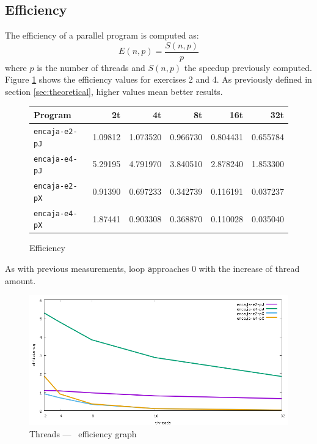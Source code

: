 \documentclass[a4paper]{article}
\newcommand{\m}[1]{\texttt{#1}}
\newcommand{\x}[1]{\m{#1}}
\begin{document}
\subsection{Efficiency}
The efficiency of a parallel program is computed as:
\begin{equation}
E(n,p)=\frac{S(n,p)}{p}
\end{equation}
where $p$ is the number of threads and $S(n,p)$ the speedup previously computed. Figure \ref{fig:table-efficiency} shows the efficiency values for exercises 2 and 4. As previously defined in section \ref{sec:theoretical}, higher values mean better results.

\begin{figure}[h]
	\centering
	\begin{tabular}{l r r r r r}
		Program 			  & 2t  	& 4t 	   & 8t 	  & 16t      & 32t 		\\ \hline
		\m{encaja-e2-pJ}	  & 1.09812 & 1.073520 & 0.966730 & 0.804431 & 0.655784	\\
		\m{encaja-e4-pJ}	  & 5.29195 & 4.791970 & 3.840510 & 2.878240 & 1.853300	\\
		\m{encaja-e2-pX}	  & 0.91390 & 0.697233 & 0.342739 & 0.116191 & 0.037237 \\
		\m{encaja-e4-pX}	  & 1.87441 & 0.903308 & 0.368870 & 0.110028 & 0.035040 \\ \hline
	\end{tabular}
	\caption{Efficiency}
	\label{fig:table-efficiency}
\end{figure}

As with previous measurements, loop \x approaches 0 with the increase of thread amount.

\begin{figure}[h]
    \centering
    \includegraphics[width=\textwidth]{../img/efficiency}
    \caption{Threads --- \unskip \, efficiency graph}
    \label{fig:graph-efficiency}
\end{figure}
\end{document}
